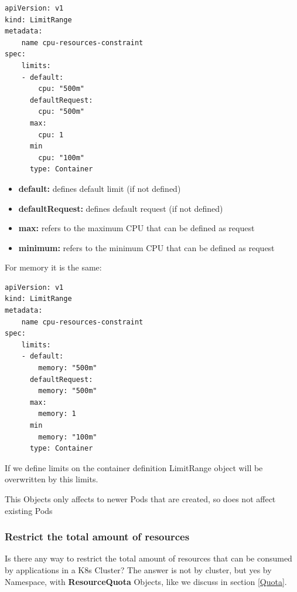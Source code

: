 \documentclass{article}
\newenvironment{blocktemplateIII}[1]{%
    \tcolorbox[beamer,%
    noparskip,breakable,
    ,colframe=Red,%
    colbacklower=LimeGreen!75!LightGreen,%
    title=#1]}%
    {\endtcolorbox}
\newenvironment{codetemplate}[1][]{%
  \mybasecolorbox[#1]
  \itshape
}{%
  \endmybasecolorbox
}
\begin{document}
\begin{codetemplate}{}
\begin{verbatim}
apiVersion: v1
kind: LimitRange
metadata:
    name cpu-resources-constraint
spec:
    limits:
    - default:
        cpu: "500m"
      defaultRequest:
        cpu: "500m"
      max:
        cpu: 1
      min
        cpu: "100m"
      type: Container
\end{verbatim}
\end{codetemplate}

\begin{itemize}
    \item \textbf{default:} defines default limit (if not defined)
    \item \textbf{defaultRequest:} defines default request (if not defined)
    \item \textbf{max:} refers to the maximum CPU that can be defined as request
    \item \textbf{minimum:} refers to the minimum CPU that can be defined as request
\end{itemize}

For memory it is the same:
\begin{codetemplate}{}
\begin{verbatim}
apiVersion: v1
kind: LimitRange
metadata:
    name cpu-resources-constraint
spec:
    limits:
    - default:
        memory: "500m"
      defaultRequest:
        memory: "500m"
      max:
        memory: 1
      min
        memory: "100m"
      type: Container
\end{verbatim}
\end{codetemplate}

\begin{blocktemplateIII}{WARNING 1}
If we define limits on the container definition LimitRange object will be overwritten by this limits.
\end{blocktemplateIII}

\begin{blocktemplateIII}{WARNING 2}
This Objects only affects to newer Pods that are created, so does not affect existing Pods
\end{blocktemplateIII}

\subsubsection{Restrict the total amount of resources}

Is there any way to restrict the total amount of resources that can be consumed by applications in a K8s Cluster? The answer is not by cluster, but yes by Namespace, with \textbf{ResourceQuota} Objects, like we discuss in section \ref{Quota}.
\end{document}
